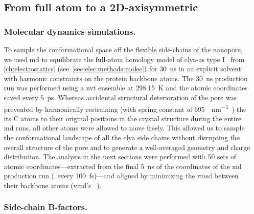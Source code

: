 \subsection{From full atom to a 2D-axisymmetric}
%
\label{sec:transport:pore_geometry}
%

\subsubsection{Molecular dynamics simulations.}
%

To sample the conformational space off the flexible side-chains of the nanopore, we used \gls{md} to
equilibrate the full-atom homology model of \gls{clya-as} type I~\cite{Soskine-2013} from
\cref{ch:electrostatics} (see~\cref{sec:elec:methods:molec}) for \SI{30}{\ns} in an explicit solvent with
harmonic constraints on the protein backbone atoms. The \SI{30}{\ns} production run was performed using a
\gls{nvt} ensemble at \SI{298.15}{\kelvin} and the atomic coordinates saved every \SI{5}{\ps}. Whereas
accidental structural deterioration of the pore was prevented by harmonically restraining (with spring
constant of \SI{695}{\pN\per\nm}~\cite{Bhattacharya-2011}) the its C\ta{} atoms to their original positions in
the crystal structure during the entire \gls{md} runs, all other atoms were allowed to move freely. This
allowed us to sample the conformational landscape of all the \gls{clya} side chains without disrupting the
overall structure of the pore and to generate a well-averaged geometry and charge distribution. The analysis
in the next sections were performed with 50 sets of atomic coordinates---extracted from the final \SI{5}{\ns}
of the coordinates of the \gls{md} production run (\ie~every \SI{100}{\fs})---and aligned by minimizing the
\gls{rmsd} between their backbone atoms (\gls{vmd}'s ~\cite{Humphrey-1996}).

\subsubsection{Side-chain B-factors.}
%

